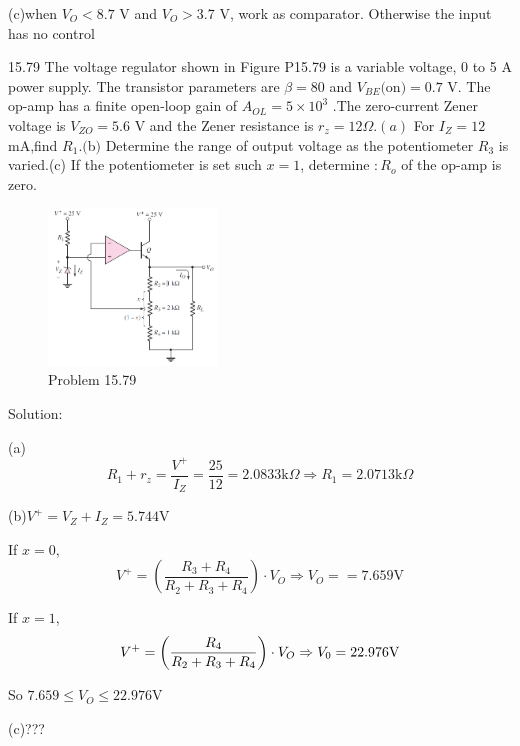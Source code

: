 \documentclass[a4paper,11pt,UTF8]{afthesis}
\begin{document}
(c)when $V_O < 8.7$ V and $V_O>$3.7 V, work as comparator. Otherwise the input has no
control

15.79 The voltage regulator shown in Figure P15.79 is a variable voltage, 0 to 5 A
power supply. The transistor parameters are $\beta=80$ and $V_{BE}( $on$) = 0.7$ V. The op-amp has a finite open-loop gain of $A_{OL}=5\times10^3$ .The zero-current Zener voltage is $V_{ZO}=5.6$ V and the Zener resistance is $r_z=12\Omega.(a)$ For $I_Z= 12$mA,find $R_1.( $b$) $ Determine the range of output voltage as the potentiometer $R_{3}$ is varied.(c) If the potentiometer is set such $x= 1$, determine $:R_o$ of the op-amp is zero.
\begin{figure}[H]
	\centering
	\includegraphics[width=0.4\textwidth]{15.79}
	\caption{Problem 15.79}
\end{figure}
\noindent Solution:

(a)
$$R_1+r_z=\frac{V^+}{I_Z}=\frac{25}{12}=2.0833\mathrm{k}\Omega\Rightarrow R_1=2.0713\mathrm{k}\Omega$$

(b)$V^+=V_Z+I_Z=5.744\mathrm{V}$

If $x=0$,$$V^+=\left(\frac{R_3+R_4}{R_2+R_3+R_4}\right)·V_O\Rightarrow V_O==7.659\mathrm{V}$$

If $x=1$, \\
	$$V^+ =\left({\frac{R_{4}}{R_{2}+R_{3}+R_{4}}}\right)\cdot V_{O}\Rightarrow V_{0}=22.976\mathrm{V}  \\
	 $$
	 
So $7.659 \leq V_{O}\leq22.976\mathrm{V}$

(c)???
\end{document}
